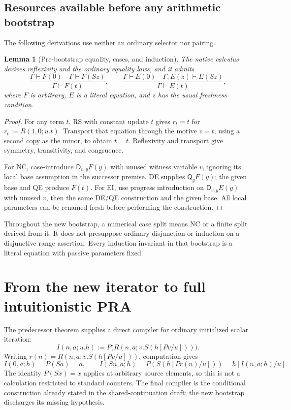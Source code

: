 \documentclass[11pt,letterpaper]{article}
\newtheorem{lemma}[theorem]{Lemma}
\theoremstyle{definition}\newtheorem{definition}[theorem]{Definition}
\theoremstyle{remark}\newtheorem{remark}[theorem]{Remark}
\newcommand{\D}{\mathsf D}
\newcommand{\Q}{\mathsf Q}
\begin{document}
\subsection{Resources available before any arithmetic bootstrap}

The following derivations use neither an ordinary selector nor pairing.

\begin{lemma}[Pre-bootstrap equality, cases, and induction]
The native calculus derives reflexivity and the ordinary equality laws,
and it admits
\[
 \frac{\Gamma\vdash F(0)\quad\Gamma\vdash F(Sz)}
      {\Gamma\vdash F(t)},\qquad
 \frac{\Gamma\vdash E(0)\quad\Gamma,E(z)\vdash E(Sz)}
      {\Gamma\vdash E(t)},
 \tag{NC, EI}\label{eq:nc-ei}
\]
where $F$ is arbitrary, $E$ is a literal equation, and $z$ has the usual
freshness condition.
\end{lemma}
\begin{proof}
For any term $t$, RS with constant update $t$ gives
$r_t=t$ for $r_t:=R(1,0;u.t)$. Transport that equation through the
motive $v=t$, using a second copy as the minor, to obtain $t=t$.
Reflexivity and transport give symmetry, transitivity, and congruence.

For NC, case-introduce $\D_{v,y}F(y)$ with unused witness variable $v$,
ignoring its local base assumption in the successor premise. DE supplies
$\Q_yF(y)$; the given base and QE produce $F(t)$. For EI, use progress
introduction on $\D_{v,y}E(y)$ with unused $v$, then the same DE/QE
construction and the given base. All local parameters can be renamed
fresh before performing the construction.
\end{proof}

Throughout the new bootstrap, a numerical case split means NC or a
finite split derived from it. It does not presuppose ordinary disjunction
or induction on a disjunctive range assertion. Every induction invariant
in that bootstrap is a literal equation with passive parameters fixed.



\section{From the new iterator to full intuitionistic PRA}\label{sec:completion}

The predecessor theorem supplies a direct compiler for ordinary initialized
scalar iteration:
\begin{equation}
 I(n,a;u.h):=P\bigl(R(n,a;v.S(h[Pv/u]))\bigr).
 \label{eq:initialization-compiler}
\end{equation}
Writing $r(n)=R(n,a;v.S(h[Pv/u]))$, computation gives
\[
 I(0,a;h)=P(Sa)=a,
 \qquad I(Sn,a;h)=P(S(h[Pr(n)/u]))=h[I(n,a;h)/u].
\]
The identity $P(Sx)=x$ applies at arbitrary source elements, so this is
not a calculation restricted to standard counters. The final compiler is
the conditional construction already stated in the shared-continuation
draft\cite{shared}; the new bootstrap discharges its missing hypothesis.
\end{document}
